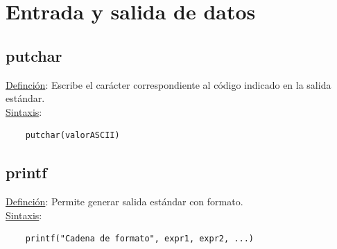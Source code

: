 \documentclass{article}
\begin{document}
\section{Entrada y salida de datos}
\subsection{putchar}
\underline{Definción}: Escribe el carácter correspondiente al código indicado en la salida estándar.
\\\underline{Sintaxis}: \begin{lstlisting}
    putchar(valorASCII)
\end{lstlisting}

\subsection{printf}
\underline{Definción}: Permite generar salida estándar con formato.
\\\underline{Sintaxis}: \begin{lstlisting}
    printf("Cadena de formato", expr1, expr2, ...)
\end{lstlisting}
\end{document}
